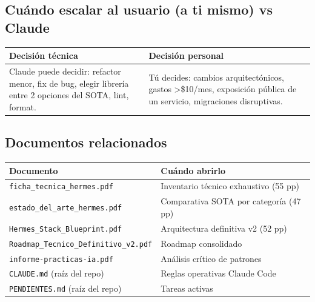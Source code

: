 \documentclass[11pt,a4paper]{article}
\begin{document}
\subsection{Cuándo escalar al usuario (a ti mismo) vs Claude}

\begin{center}
\begin{tabularx}{0.95\textwidth}{|X|X|}
\hline
\rowcolor{manualgreen}\color{white}\textbf{Decisión técnica} & \color{white}\textbf{Decisión personal}\\
\hline
Claude puede decidir: refactor menor, fix de bug, elegir librería entre 2 opciones del SOTA, lint, format. & Tú decides: cambios arquitectónicos, gastos \textgreater \$10/mes, exposición pública de un servicio, migraciones disruptivas.\\
\hline
\end{tabularx}
\end{center}

\subsection{Documentos relacionados}

\begin{center}
\begin{tabularx}{0.95\textwidth}{|l|X|}
\hline
\rowcolor{manualgreen}\color{white}\textbf{Documento} & \color{white}\textbf{Cuándo abrirlo}\\
\hline
\texttt{ficha\_tecnica\_hermes.pdf} & Inventario técnico exhaustivo (55 pp)\\
\texttt{estado\_del\_arte\_hermes.pdf} & Comparativa SOTA por categoría (47 pp)\\
\texttt{Hermes\_Stack\_Blueprint.pdf} & Arquitectura definitiva v2 (52 pp)\\
\texttt{Roadmap\_Tecnico\_Definitivo\_v2.pdf} & Roadmap consolidado\\
\texttt{informe-practicas-ia.pdf} & Análisis crítico de patrones\\
\texttt{CLAUDE.md} (raíz del repo) & Reglas operativas Claude Code\\
\texttt{PENDIENTES.md} (raíz del repo) & Tareas activas\\
\hline
\end{tabularx}
\end{center}

\vspace{1.5cm}

\begin{center}
\end{center}
\end{document}
